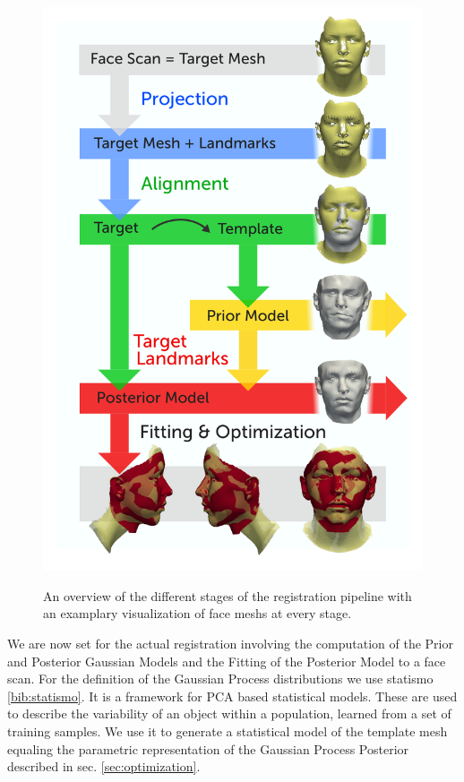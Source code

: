 \begin{figure}[h!]
\centering
\includegraphics[width=.9\textwidth]{./resources/figures/pipeline.pdf}
\label{fig:pipeline}
\vspace{-20pt}
\caption{An overview of the different stages of the registration pipeline with an examplary visualization of face meshs at every stage.}
\end{figure}

We are now set for the actual registration involving the computation of the Prior and Posterior Gaussian Models and the Fitting of the Posterior Model to a face scan. For the definition of the Gaussian Process distributions we use statismo \ref{bib:statismo}. It is a framework for PCA based statistical models. These are used to describe the variability of an object within a population, learned from a set of training samples. We use it to generate a statistical
model of the template mesh equaling the parametric representation of the Gaussian Process Posterior described in sec. \ref{sec:optimization}. 

